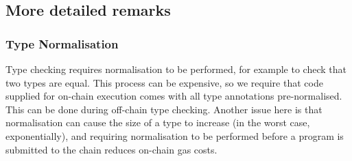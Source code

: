 \documentclass[a4paper]{article}
\begin{document}
\subsection{More detailed remarks}
\subsubsection{Type Normalisation}
 Type checking requires normalisation to be performed, for example to
 check that two types are equal.  This process can be expensive, so we
 require that code supplied for on-chain execution comes with all type
 annotations pre-normalised.  This can be done during off-chain type
 checking.  Another issue here is that normalisation can cause the
 size of a type to increase (in the worst case, exponentially), and
 requiring normalisation to be performed before a program is submitted
 to the chain reduces on-chain gas costs.


\end{document}
